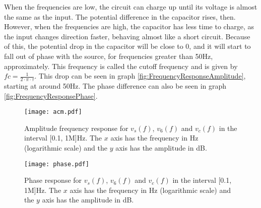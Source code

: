 When the frequencies are low, the circuit can charge up until its voltage is almost the same as the input. The potential difference in the capacitor rises, then. However, when the frequencies are high, the capacitor has less time to charge, as the input changes direction faster, behaving almost like a short circuit. Because of this, the potential drop in the capacitor will be close to 0, and it will start to fall out of phase with the source, for frequencies greater than 50Hz, approximately. This frequency is called the cutoff frequency and is given by $fc=\frac{1}{2\cdot\pi\cdot\tau}$. This drop can be seen in graph \ref{fig:FrequencyResponseAmplitude}, starting at around 50Hz. The phase difference can also be seen in graph \ref{fig:FrequencyResponsePhase}.

\begin{figure}[H] \centering
\texttt{[image: acm.pdf]}
\caption{Amplitude frequency response for $v_s(f)$, $v_6(f)$ and $v_c(f)$ in the interval [0.1, 1M]Hz. The $x$ axis has the frequency in Hz (logarithmic scale) and the $y$ axis has the amplitude in dB. }
\label{fig:sim_acm}
\end{figure}
\par
\begin{figure}[H] \centering
\texttt{[image: phase.pdf]}
\caption{Phase response for $v_s(f)$, $v_6(f)$ and $v_c(f)$ in the interval [0.1, 1M]Hz. The $x$ axis has the frequency in Hz (logarithmic scale) and the $y$ axis has the amplitude in dB.}
\label{fig:sim_phase}
\end{figure}



